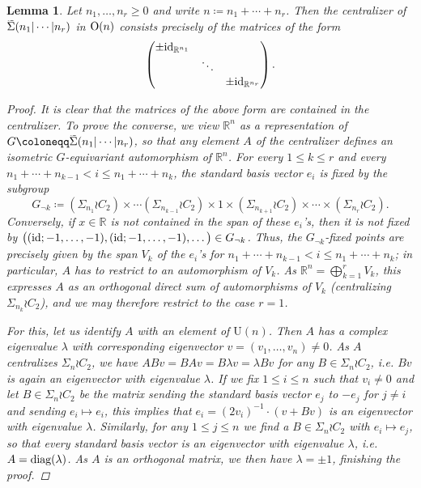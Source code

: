 \documentclass[reqno]{memo-l}
\theoremstyle{mythm}
\newtheorem{lemma}[thm]{Lemma}
\theoremstyle{definition}
\numberwithin{equation}{section}
\newcommand{\R} {{\mathbb{R}}}
\renewcommand{\O}{{\textup{O}}}
\newcommand{\Sig}{\smash{\widetilde{\vphantom{t}\smash{\Sigma}}}}
\newcommand{\id}{\textup{id}}
\newcommand{\diag}{\textup{diag}}
\begin{document}
\begin{lemma}\label{lemma:centralizer-block-permutations}
    Let $n_1,\dots,n_r\ge0$ and write $n\coloneqq n_1+\cdots+n_r$. Then the centralizer of $\Sig(n_1|\cdots|n_r)$ in $\O(n)$ consists precisely of the matrices of the form
    \begin{equation}\label{eq:block-centralizer}
        \begin{pmatrix}
            \pm\id_{\R^{n_1}}\\
            &\ddots\\
            &&\pm\id_{\R^{n_r}}
        \end{pmatrix}.
    \end{equation}    
    \begin{proof}
        It is clear that the matrices of the above form are contained in the centralizer. To prove the converse, we view $\R^n$ as a representation of $G\coloneqq \Sig(n_1|\cdots|n_r)$, so that any element $A$ of the centralizer defines an isometric $G$-equivariant automorphism of $\R^n$. For every $1\le k\le r$ and every $n_1+\cdots+n_{k-1}<i\le n_1+\cdots+n_k$, the standard basis vector $e_i$ is fixed by the subgroup 
        \[
            G_{\lnot k}\coloneqq(\Sigma_{n_1}\wr C_2)\times\cdots(\Sigma_{n_{k-1}}\wr C_2)\times1\times(\Sigma_{n_{k+1}}\wr C_2)\times\cdots\times(\Sigma_{n_r}\wr C_2).
        \]
        Conversely, if $x\in\R$ is not contained in the span of these $e_i$'s, then it is not fixed by $\big((\id;-1,\dots,-1),(\id;-1,\dots,-1),\dots\big)\in G_{\lnot k}$. Thus, the $G_{\lnot k}$-fixed points are precisely given by the span $V_k$ of the $e_i$'s for $n_1+\cdots+n_{k-1}<i\le n_1+\cdots+n_k$; in particular, $A$ has to restrict to an automorphism of $V_k$. As $\R^n=\bigoplus_{k=1}^r V_k$, this expresses $A$ as an orthogonal direct sum of automorphisms of $V_k$ (centralizing $\Sigma_{n_k}\wr C_2$), and we may therefore restrict to the case $r=1$.
        
        For this, let us identify $A$ with an element of $\text{U}(n)$. Then $A$ has a complex eigenvalue $\lambda$ with corresponding eigenvector $v=(v_1,\dots,v_n)\not=0$. As $A$ centralizes $\Sigma_n\wr C_2$, we have $ABv=BAv=B\lambda v=\lambda Bv$ for any $B\in\Sigma_n\wr C_2$, i.e. $Bv$ is again an eigenvector with eigenvalue $\lambda$. If we fix $1\le i\le n$ such that $v_i\not=0$ and let $B\in\Sigma_n\wr C_2$ be the matrix sending the standard basis vector $e_j$ to $-e_j$ for $j\not=i$ and sending $e_i\mapsto e_i$, this implies that $e_i=(2v_i)^{-1}\cdot(v+Bv)$ is an eigenvector with eigenvalue $\lambda$. Similarly, for any $1\le j\le n$ we find a $B\in\Sigma_n\wr C_2$ with $e_i\mapsto e_j$, so that every standard basis vector is an eigenvector with eigenvalue $\lambda$, i.e.~$A=\diag(\lambda)$. As $A$ is an orthogonal matrix, we then have $\lambda=\pm1$, finishing the proof.
    \end{proof}
\end{lemma}
\end{document}
